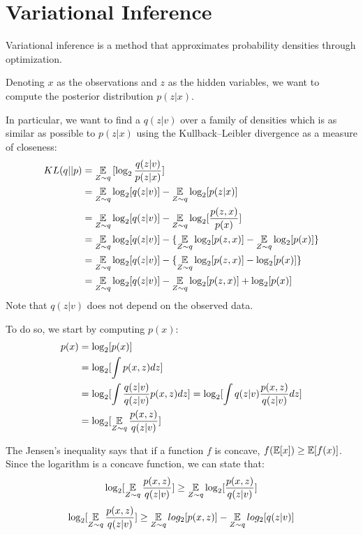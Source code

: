 \chapter{Variational Inference} \label{vi}
Variational inference is a method that approximates probability densities through optimization.

Denoting $x$ as the observations and $z$ as the hidden variables,
we want to compute the posterior distribution $p(z | x)$.

In particular, we want to find a $q(z | v)$ over a family of densities
which is as similar as possible to $p(z | x)$ using the Kullback–Leibler divergence as a measure of closeness:
\begin{equation} \label{eq:klexpanded}
    \begin{split}
        KL(q || p) & = \operatorname*{\mathbb{E}}_{Z \sim q} {[\log_2 \frac{q(z | v)}{p(z | x)}]} \\
        & = \operatorname*{\mathbb{E}}_{Z \sim q} \log_2 [q(z | v)] - \operatorname*{\mathbb{E}}_{Z \sim q} \log_2 [p(z | x)] \\
        & = \operatorname*{\mathbb{E}}_{Z \sim q} \log_2 [q(z | v)] - \operatorname*{\mathbb{E}}_{Z \sim q} \log_2 [\frac{p(z,x)}{p(x)}] \\
        & = \operatorname*{\mathbb{E}}_{Z \sim q} \log_2 [q(z | v)] - \{ \operatorname*{\mathbb{E}}_{Z \sim q} \log_2 [p(z,x)] - \operatorname*{\mathbb{E}}_{Z \sim q} \log_2 [p(x)] \} \\
        & = \operatorname*{\mathbb{E}}_{Z \sim q} \log_2 [q(z | v)] - \{ \operatorname*{\mathbb{E}}_{Z \sim q} \log_2 [p(z,x)] - \log_2 [p(x)] \} \\
        & = \operatorname*{\mathbb{E}}_{Z \sim q} \log_2 [q(z | v)] - \operatorname*{\mathbb{E}}_{Z \sim q} \log_2 [p(z,x)] + \log_2 [p(x)]
    \end{split}
\end{equation}
Note that $q(z | v)$ does not depend on the observed data.

To do so, we start by computing $p(x)$:
\begin{equation*}
    \begin{split}
        p(x) & = \log_2[p(x)] \\
        & = \log_2[\int p(x,z) dz]  \\
        & = \log_2[\int \frac{q(z | v)}{q(z | v)} p(x,z) dz] = \log_2[\int q(z | v) \frac{p(x,z)}{q(z | v)} dz] \\
        & = \log_2[\operatorname*{\mathbb{E}}_{Z \sim q} \frac{p(x,z)}{q(z | v)}]
    \end{split}
\end{equation*}

The Jensen's inequality says that if a function $f$ is concave, $f(\operatorname*{\mathbb{E}}[x]) \geq \operatorname*{\mathbb{E}}[f(x)]$.
Since the logarithm is a concave function, we can state that:
$$ \log_2[\operatorname*{\mathbb{E}}_{Z \sim q} \frac{p(x,z)}{q(z | v)}] \geq \operatorname*{\mathbb{E}}_{Z \sim q} \log_2[\frac{p(x,z)}{q(z | v)}] $$
$$ \log_2[\operatorname*{\mathbb{E}}_{Z \sim q} \frac{p(x,z)}{q(z | v)}] \geq \operatorname*{\mathbb{E}}_{Z \sim q} log_2[p(x,z)] - \operatorname*{\mathbb{E}}_{Z \sim q} log_2[q(z | v)] $$

